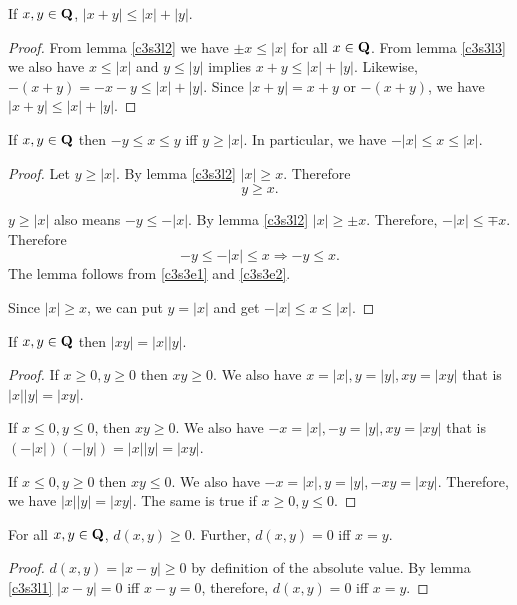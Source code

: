 \begin{lem}\label{c3s3l4}
If $x, y \in \mathbf{Q}$, $|x + y| \le |x| + |y|$.
\end{lem}
\begin{proof}
From lemma \ref{c3s3l2} we have $\pm x \le |x|$ for all $x \in \mathbf{Q}$. From
lemma \ref{c3s3l3} we also have $x \le |x|$ and $y \le |y|$ implies $x + y 
\le |x| + |y|$. Likewise, $-(x + y) = -x - y \le |x| + |y|$. Since $|x + y|
= x + y$ or $-(x+y)$, we have $|x + y| \le |x| + |y|$.
\end{proof}

\begin{lem}\label{c3s3l5}
If $x, y \in \mathbf{Q}$ then $-y \le x \le y$ iff $y \ge |x|$. In particular,
we have $-|x| \le x \le |x|$.
\end{lem}
\begin{proof}
Let $y \ge |x|$. By lemma \ref{c3s3l2} $|x| \ge x$. Therefore 
\begin{equation}\label{c3s3e1}
y \ge x.
\end{equation}

$y \ge |x|$ also means $-y \le -|x|$. By lemma \ref{c3s3l2} $|x| \ge \pm x$.
Therefore, $-|x| \le \mp x$. Therefore 
\begin{equation}\label{c3s3e2}
-y \le -|x| \le x \Rightarrow -y \le x.
\end{equation}
The lemma follows from \eqref{c3s3e1} and \eqref{c3s3e2}.

Since $|x| \ge x$, we can put $y = |x|$ and get $-|x| \le x \le |x|$.
\end{proof}

\begin{lem}\label{c3s3l6}
If $x, y \in \mathbf{Q}$ then $|xy| = |x||y|$.
\end{lem}
\begin{proof}
If $x \ge 0, y \ge 0$ then $xy \ge 0$. We also have $x = |x|, y = |y|, xy
= |xy|$ that is $|x||y| = |xy|$.

If $x \le 0, y \le 0$, then $xy \ge 0$. We also have $-x = |x|, -y = |y|,
xy = |xy|$ that is $(-|x|)(-|y|) = |x||y| = |xy|$.

If $x \le 0, y \ge 0$ then $xy \le 0$. We also have $-x = |x|, y = |y|,
-xy = |xy|$. Therefore, we have $|x||y| = |xy|$. The same is true if $x \ge
0, y \le 0$.
\end{proof}

\begin{lem}\label{c3s3l7}
For all $x, y \in \mathbf{Q}$, $d(x, y) \ge 0$. Further, $d(x, y) = 0$ iff 
$x = y$.
\end{lem}
\begin{proof}
$d(x, y) = |x - y| \ge 0$ by definition of the absolute value. By lemma
\ref{c3s3l1} $|x - y| = 0$ iff $x - y = 0$, therefore, $d(x, y) = 0$ iff
$x = y$.
\end{proof}

